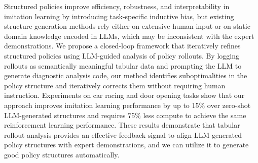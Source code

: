 
Structured policies improve efficiency, robustness, and interpretability in imitation learning by introducing task-specific inductive bias, but existing structure generation methods rely either on extensive human input or on static domain knowledge encoded in LLMs, which may be inconsistent with the expert demonstrations.
We propose a closed-loop framework that iteratively refines structured policies using LLM-guided analysis of policy rollouts.
By logging rollouts as semantically meaningful tabular data and prompting the LLM to generate diagnostic analysis code, our method identifies suboptimalities in the policy structure and iteratively corrects them without requiring human instruction.
Experiments on car racing and door opening tasks show that our approach improves imitation learning performance by up to 15\% over zero-shot LLM-generated structures and requires 75\% less compute to achieve the same reinforcement learning performance.
These results demonstrate that tabular rollout analysis provides an effective feedback signal to align LLM-generated policy structures with expert demonstrations, and we can utilize it to generate good policy structures automatically.